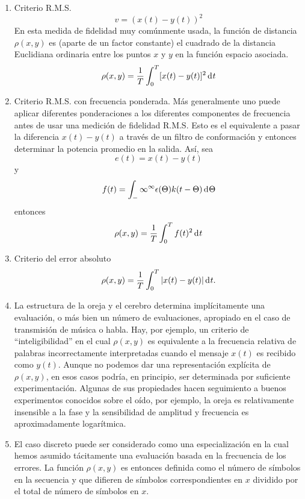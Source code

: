 \begin{enumerate}
\item{Criterio R.M.S. 
\begin{equation} v = (x(t) - y(t))^{2} \end{equation}
En esta medida de fidelidad muy com\'unmente usada, la funci\'on de
distancia $\rho(x,y)$ es (aparte de un factor constante) el cuadrado
de la distancia Euclidiana ordinaria entre los puntos $x$ y $y$ en la
funci\'on espacio asociada.
\begin{equation} \rho(x, y) = \frac{1}{T} \int_0^T [x(t) - y(t)]^{2} \diff t \end{equation}}
\item{Criterio R.M.S. con frecuencia ponderada. M\'as generalmente uno puede
aplicar diferentes ponderaciones a los diferentes componentes de frecuencia
antes de usar una medici\'on de fidelidad R.M.S. Esto es el equivalente a pasar
la diferencia $x(t) - y(t)$ a trav\'es de un filtro de conformaci\'on y entonces 
determinar la potencia promedio en la salida.
As\'i, sea 
\begin{equation} e(t) = x(t) - y(t) \end{equation}
y
\begin{equation} f(t) = \int_-\infty^\infty  \epsilon(\Theta)k(t - \Theta) 
\diff \Theta \end{equation}
entonces
\begin{equation} 
\rho (x, y) = \frac{1}{T} \int_0^T f(t)^{2} \diff t 
\end{equation}}
\item{Criterio del error absoluto
\begin{equation} 
\rho(x,y) = \frac{1}{T} \int_0^T | x(t) - y(t)| \diff t . 
\end{equation}}
\item{La estructura de la oreja y el cerebro determina
 impl\'icitamente una evaluaci\'on, o m\'as bien un n\'umero de
 evaluaciones, apropiado en el caso de transmisi\'on de m\'usica o
 habla. Hay, por ejemplo, un criterio de ``inteligibilidad'' en el cual
 $\rho(x,y)$ es equivalente a la frecuencia relativa de palabras
 incorrectamente interpretadas cuando el mensaje $x(t)$ es recibido
 como $y(t)$. Aunque no podemos dar una representaci\'on expl\'icita
 de $\rho(x,y)$, en esos casos podr\'ia, en principio, ser
 determinada por suficiente experimentaci\'on. Algunas de sus
 propiedades hacen seguimiento a buenos experimentos conocidos sobre
 el o\'ido, por ejemplo, la oreja es relativamente insensible a la
 fase y la sensibilidad de amplitud y frecuencia es aproximadamente
 logar\'itmica.}
\item{El caso discreto puede ser considerado como una
 especializaci\'on en la cual hemos asumido t\'acitamente una
 evaluaci\'on basada en la frecuencia de los errores. La funci\'on
 $\rho(x,y)$ es entonces definida como el n\'umero de s\'imbolos en
 la secuencia y que difieren de s\'imbolos correspondientes en $x$
 dividido por el total de n\'umero de s\'imbolos en $x$.}
\end{enumerate}


